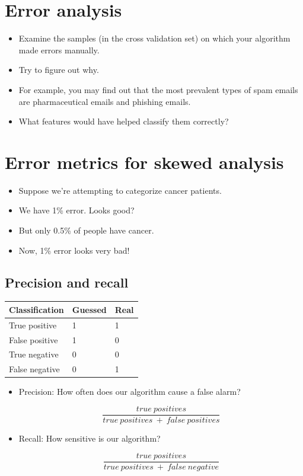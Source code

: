 \documentclass{article}
\begin{document}
\section*{Error analysis}

\begin{itemize}
  \item Examine the samples (in the cross validation set) on which your algorithm made errors manually.
  \item Try to figure out why.
  \item For example, you may find out that the most prevalent types of spam emails are pharmaceutical emails and phishing emails.
  \item What features would have helped classify them correctly?
\end{itemize}

\section*{Error metrics for skewed analysis}

\begin{itemize}
  \item Suppose we're attempting to categorize cancer patients.
  \item We have 1\% error. Looks good?
  \item But only 0.5\% of people have cancer.
  \item Now, 1\% error looks very bad!
\end{itemize}

\subsection*{Precision and recall}

\begin{table}[hbt!]
  \centering
  \begin{tabular}{|l|l|l|}
    \hline
    Classification & Guessed & Real \\
    \hline
    True positive  & 1       & 1    \\
    False positive & 1       & 0    \\
    True negative  & 0       & 0    \\
    False negative & 0       & 1    \\
    \hline
  \end{tabular}
\end{table}

\begin{itemize}
  \item Precision: How often does our algorithm cause a false alarm?

        $$\frac{true\ positives}{ true\ positives\ +\ false\ positives}$$

  \item Recall: How sensitive is our algorithm?

        $$\frac{true\ positives}{ true\ positives\ +\ false\ negative}$$
\end{itemize}
\end{document}
